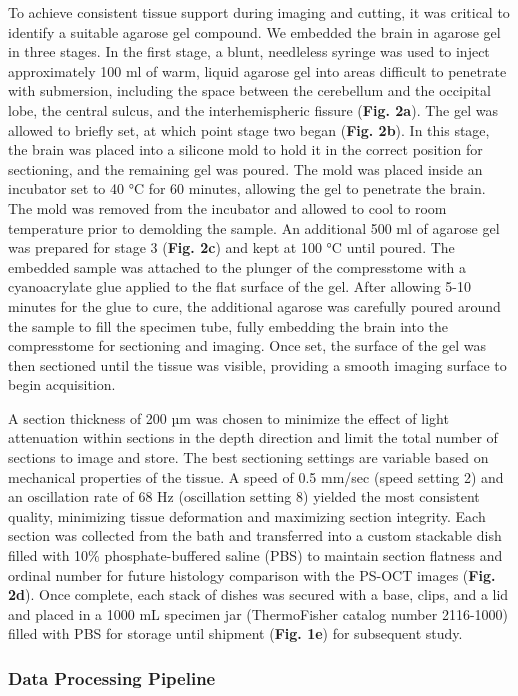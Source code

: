 \documentclass{article}
\begin{document}
To achieve consistent tissue support during imaging and cutting, it was critical to identify a suitable agarose gel compound. We embedded the brain in agarose gel in three stages. In the first stage, a blunt, needleless syringe was used to inject approximately 100 ml of warm, liquid agarose gel into areas difficult to penetrate with submersion, including the space between the cerebellum and the occipital lobe, the central sulcus, and the interhemispheric fissure (\textbf{Fig. 2a}). The gel was allowed to briefly set, at which point stage two began (\textbf{Fig. 2b}). In this stage, the brain was placed into a silicone mold to hold it in the correct position for sectioning, and the  remaining gel was poured. The mold was placed inside an incubator set to 40 °C for 60 minutes, allowing the gel to penetrate the brain. The mold was removed from the incubator and allowed to cool to room temperature prior to demolding the sample. An additional 500 ml of agarose gel was prepared for stage 3 (\textbf{Fig. 2c}) and kept at 100 °C until poured. The embedded sample was attached to the plunger of the compresstome with a cyanoacrylate glue applied to the flat surface of the gel. After allowing 5-10 minutes for the glue to cure, the additional agarose was carefully poured around the sample to fill the specimen tube, fully embedding the brain into the compresstome for sectioning and imaging. Once set, the surface of the gel was then sectioned until the tissue was visible, providing a smooth imaging surface to begin acquisition.

A section thickness of 200 µm was chosen to minimize the effect of light attenuation within sections in the depth direction and limit the total number of sections to image and store. The best sectioning settings are variable based on mechanical properties of the tissue. A speed of 0.5 mm/sec (speed setting 2) and an oscillation rate of 68 Hz (oscillation setting 8) yielded the most consistent quality, minimizing tissue deformation and maximizing section integrity. Each section was collected from the bath and transferred into a custom stackable dish filled with 10\% phosphate-buffered saline (PBS) to maintain section flatness and ordinal number for future histology comparison with the PS-OCT images (\textbf{Fig. 2d}). Once complete, each stack of dishes was secured with a base, clips, and a lid and placed in a 1000 mL specimen jar (ThermoFisher catalog number 2116-1000) filled with PBS for storage until shipment (\textbf{Fig. 1e}) for subsequent study.

\subsubsection*{Data Processing Pipeline}
\end{document}
